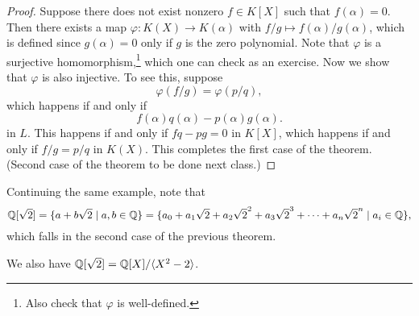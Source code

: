 \begin{proof}
  Suppose there does not exist nonzero $f \in K[X]$ such
  that $f(\alpha) = 0$. Then there exists a map
  $\varphi : K(X) \to K(\alpha)$ with
  $f / g \mapsto f(\alpha) / g(\alpha)$, which is
  defined since $g(\alpha) = 0$ only if $g$ is the
  zero polynomial. Note that $\varphi$ is a
  surjective homomorphism,\footnote{Also check that $\varphi$ is well-defined.} which one can check as
  an exercise. Now we show that $\varphi$ is also
  injective. To see this, suppose
  \[
    \varphi(f / g) = \varphi(p / q),
  \]
  which happens if and only if
  \[
    f(\alpha) q(\alpha) - p(\alpha) g(\alpha).
  \]
  in $L$. This happens if and only if $fq - pg = 0$
  in $K[X]$, which happens if and only if $f / g = p / q$
  in $K(X)$. This completes the first case of the theorem.
  (Second case of the theorem to be done next class.)
\end{proof}

\begin{example}
  Continuing the same example, note that
  \[
    \mathbb{Q}[\sqrt{2}] = \{a + b\sqrt{2} \mid a, b \in \mathbb{Q}\}
    = \{a_0 + a_1 \sqrt{2} + a_2 \sqrt{2}^2 + a_3 \sqrt{2}^3 + \dots + a_n \sqrt{2}^n \mid a_i \in \mathbb{Q}\},
  \]
  which falls in the second case of the previous theorem.
\end{example}

\begin{remark}
  We also have $\mathbb{Q}[\sqrt{2}] = \mathbb{Q}[X] / \langle X^2 - 2 \rangle$.
\end{remark}

